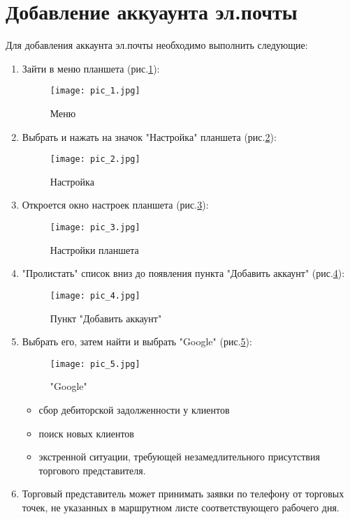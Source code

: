 \section{Добавление аккуаунта эл.почты}
Для добавления аккаунта эл.почты необходимо выполнить следующие:
\begin{enumerate}[\thesection .1]
\item  Зайти в меню планшета (рис.\ref{pic:pic_1}):
 \begin{figure}[H]
 	\texttt{[image: pic\_1.jpg]} 
 	\caption{Меню}\label{pic:pic_1}
 \end{figure}
\item Выбрать и нажать на значок "Настройка" планшета (рис.\ref{pic:pic_2}):
 \begin{figure}[H]
 	\texttt{[image: pic\_2.jpg]} 
 	\caption{Настройка}\label{pic:pic_2}
 \end{figure}
\item Откроется окно настроек планшета (рис.\ref{pic:pic_3}):
 \begin{figure}[H]
 	\texttt{[image: pic\_3.jpg]} 
 	\caption{Настройки планшета}\label{pic:pic_3}
 \end{figure}
 \item "Пролистать" список вниз до появления пункта "Добавить аккаунт" (рис.\ref{pic:pic_4}):
  \begin{figure}[H]
  	\texttt{[image: pic\_4.jpg]} 
  	\caption{Пункт "Добавить аккаунт"}\label{pic:pic_4}
  \end{figure}
\item Выбрать его, затем найти и выбрать "Google" (рис.\ref{pic:pic_5}):
  \begin{figure}[H]
  	\texttt{[image: pic\_5.jpg]} 
  	\caption{"Google"}\label{pic:pic_5}
  \end{figure}
  
\begin{itemize}[topsep=0pt, itemsep=-0.5ex]
	\item сбор дебиторской задолженности у клиентов
	\item поиск новых клиентов
	\item экстренной ситуации, требующей незамедлительного присутствия торгового представителя.
\end{itemize}
\item Торговый представитель может принимать заявки по телефону от торговых точек, не указанных в маршрутном листе соответствующего рабочего дня.
\end{enumerate}